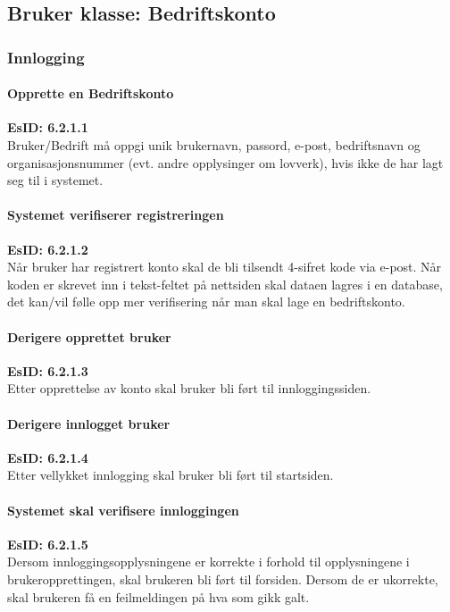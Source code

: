 \documentclass[12pt]{article}
\begin{document}
    \subsection{Bruker klasse: Bedriftskonto}

        \subsubsection{Innlogging}
            
            \paragraph{Opprette en Bedriftskonto}
            \textbf{EsID: 6.2.1.1}\\Bruker/Bedrift må oppgi unik brukernavn, passord, e-post, bedriftsnavn og organisasjonsnummer (evt. andre opplysinger om lovverk), hvis ikke de har lagt seg til i systemet.

            \paragraph{Systemet verifiserer registreringen}
            \textbf{EsID: 6.2.1.2}\\Når bruker har registrert konto skal de bli tilsendt 4-sifret kode via e-post. Når koden er skrevet inn i tekst-feltet på nettsiden skal dataen lagres i en database, det kan/vil følle opp mer verifisering når man skal lage en bedriftskonto.

            \paragraph{Derigere opprettet bruker}
            \textbf{EsID: 6.2.1.3}\\Etter opprettelse av konto skal bruker bli ført til innloggingssiden.

            \paragraph{Derigere innlogget bruker}
            \textbf{EsID: 6.2.1.4}\\Etter vellykket innlogging skal bruker bli ført til startsiden.

            \paragraph{Systemet skal verifisere innloggingen}
            \textbf{EsID: 6.2.1.5}\\Dersom innloggingsopplysningene er korrekte i forhold til opplysningene i brukeropprettingen, skal brukeren bli ført til forsiden. Dersom de er ukorrekte, skal brukeren få en feilmeldingen på hva som gikk galt.
\end{document}
